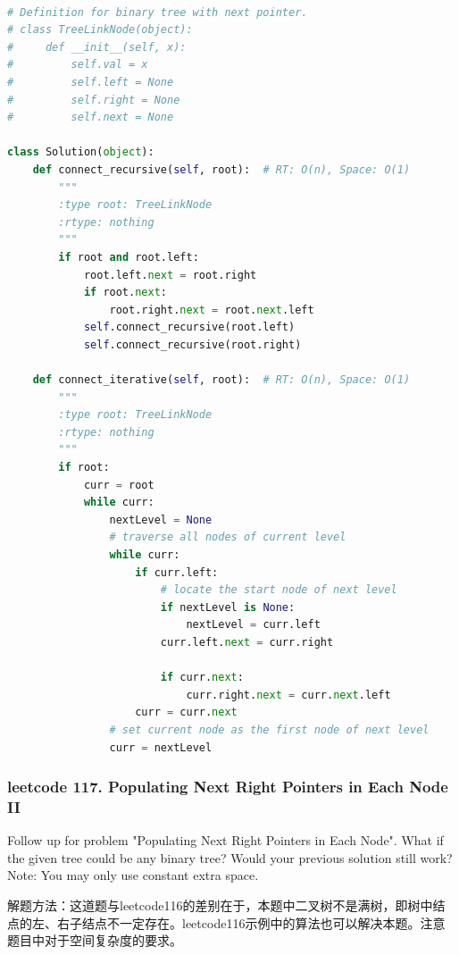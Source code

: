 \documentclass[a4paper,10pt]{article}
\begin{document}
\begin{lstlisting}[language=Python, caption=Problem116. Populating Next Right Pointers in Each Node]

# Definition for binary tree with next pointer.
# class TreeLinkNode(object):
#     def __init__(self, x):
#         self.val = x
#         self.left = None
#         self.right = None
#         self.next = None

class Solution(object):
    def connect_recursive(self, root):  # RT: O(n), Space: O(1)
        """
        :type root: TreeLinkNode
        :rtype: nothing
        """
        if root and root.left:
            root.left.next = root.right
            if root.next:
                root.right.next = root.next.left
            self.connect_recursive(root.left)
            self.connect_recursive(root.right)

    def connect_iterative(self, root):  # RT: O(n), Space: O(1)
        """
        :type root: TreeLinkNode
        :rtype: nothing
        """
        if root:
            curr = root
            while curr:
                nextLevel = None
                # traverse all nodes of current level
                while curr:
                    if curr.left:
                        # locate the start node of next level
                        if nextLevel is None:
                            nextLevel = curr.left
                        curr.left.next = curr.right

                        if curr.next:
                            curr.right.next = curr.next.left
                    curr = curr.next
                # set current node as the first node of next level
                curr = nextLevel
\end{lstlisting}


\subsubsection{leetcode 117. Populating Next Right Pointers in Each Node II}
Follow up for problem "Populating Next Right Pointers in Each Node". What if the given tree could be any binary tree? Would your previous solution still work? Note: You may only use constant extra space.\\

\begin{CJK*}{UTF8}{gbsn}
\noindent 解题方法：这道题与leetcode116的差别在于，本题中二叉树不是满树，即树中结点的左、右子结点不一定存在。leetcode116示例中的算法也可以解决本题。注意题目中对于空间复杂度的要求。
\end{CJK*}
\end{document}
